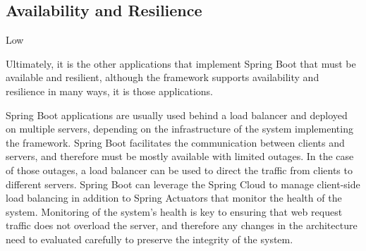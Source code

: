 \subsection*{Availability and Resilience}

\ranking Low

Ultimately, it is the other applications that implement Spring Boot that must be available and resilient, although the framework supports availability and resilience in many ways, it is those applications.

Spring Boot applications are usually used behind a load balancer and deployed on multiple servers, depending on the infrastructure of the system implementing the framework. Spring Boot facilitates the communication between clients and servers, and therefore must be mostly available with limited outages. In the case of those outages, a load balancer can be used to direct the traffic from clients to different servers. Spring Boot can leverage the Spring Cloud to manage client-side load balancing in addition to Spring Actuators that monitor the health of the system. Monitoring of the system's health is key to ensuring that web request traffic does not overload the server, and therefore any changes in the architecture need to evaluated carefully to preserve the integrity of the system.